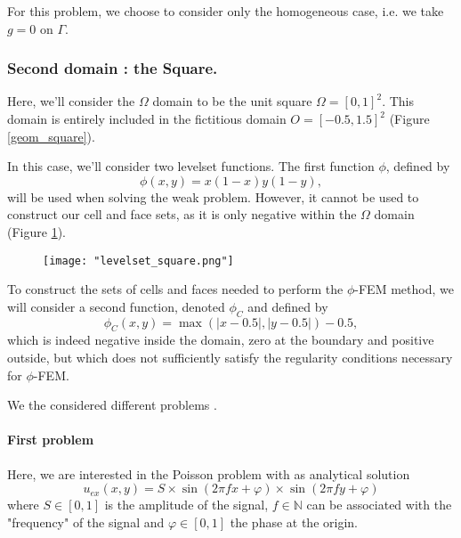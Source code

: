 \begin{Rem}
	For this problem, we choose to consider only the homogeneous case, i.e. we take $g=0$ on $\Gamma$.
\end{Rem}

\subsubsection{Second domain : the Square.} \label{Corr.pb.square}

Here, we'll consider the $\Omega$ domain to be the unit square $\Omega=[0,1]^2$. This domain is entirely included in the fictitious domain $O=[-0.5,1.5]^2$ (Figure \ref{geom_square}).

In this case, we'll consider two levelset functions. The first function $\phi$, defined by
\begin{equation*}
	\phi(x,y)=x(1-x)y(1-y),
\end{equation*}
will be used when solving the weak problem. However, it cannot be used to construct our cell and face sets, as it is only negative within the $\Omega$ domain (Figure \ref{levelset_square}).

\begin{figure}[H]
	\centering
	\texttt{[image: "levelset\_square.png"]}
	\label{levelset_square}
\end{figure} 

To construct the sets of cells and faces needed to perform the $\phi$-FEM method, we will consider a second function, denoted $\phi_C$ and defined by
\begin{equation*}
	\phi_C(x,y)=\max(|x-0.5|,|y-0.5|)-0.5,
\end{equation*}
which is indeed negative inside the domain, zero at the boundary and positive outside, but which does not sufficiently satisfy the regularity conditions necessary for $\phi$-FEM.

We the considered different problems .

\paragraph{First problem} \label{Corr.pb.square.1}

Here, we are interested in the Poisson problem with as analytical solution
\begin{equation*}
	u_{ex}(x,y)=S\times\sin\left(2\pi fx+\varphi\right)\times\sin\left(2\pi fy+\varphi\right)
\end{equation*}
where $S\in[0,1]$ is the amplitude of the signal, $f\in\mathbb{N}$ can be associated with the "frequency" of the signal and $\varphi\in[0,1]$ the phase at the origin.

